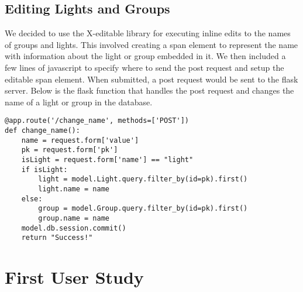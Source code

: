 \documentclass[oneside,openright]{book}
\begin{document}
\subsection{Editing Lights and Groups}
We decided to use the X-editable library for executing inline edits to the names of groups and lights. This involved creating a span element to represent the name with information about the light or group embedded in it. We then included a few lines of javascript to specify where to send the post request and setup the editable span element. When submitted, a post request would be sent to the flask server. Below is the flask function that handles the post request and changes the name of a light or group in the database.
\begin{lstlisting}
@app.route('/change_name', methods=['POST'])
def change_name():
    name = request.form['value']
    pk = request.form['pk']
    isLight = request.form['name'] == "light"
    if isLight:
        light = model.Light.query.filter_by(id=pk).first()
        light.name = name
    else:
        group = model.Group.query.filter_by(id=pk).first()
        group.name = name
    model.db.session.commit()
    return "Success!"
\end{lstlisting}
\section{First User Study}
\end{document}
